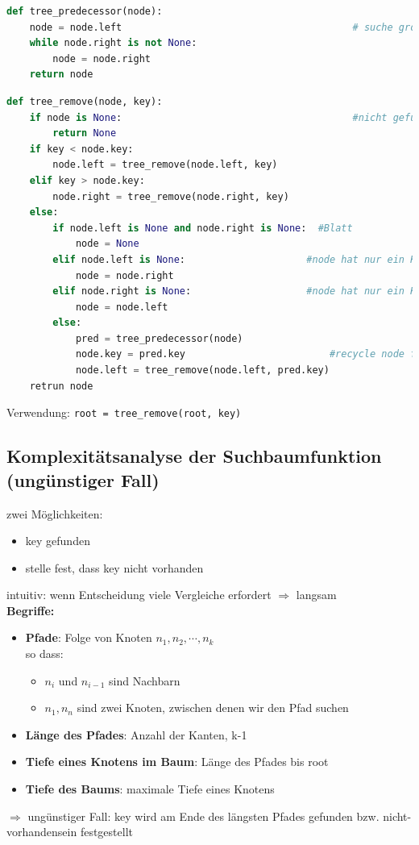 \documentclass[11pt, fleqn]{scrreprt}
\begin{document}
\begin{lstlisting}[language=Python]
def tree_predecessor(node):
	node = node.left										# suche groessten Key im linken Teilbaum
	while node.right is not None:
		node = node.right
	return node
\end{lstlisting}
	
\begin{lstlisting}[language=Python]
def tree_remove(node, key):
	if node is None: 										#nicht gefunden
		return None
	if key < node.key:
		node.left = tree_remove(node.left, key)
	elif key > node.key:
		node.right = tree_remove(node.right, key)
	else:																#key gefunden
		if node.left is None and node.right is None:  #Blatt
			node = None
		elif node.left is None:						#node hat nur ein Kind
			node = node.right
		elif node.right is None:					#node hat nur ein Kind
			node = node.left
		else:															#node hat 2 Kinder
			pred = tree_predecessor(node)
			node.key = pred.key							#recycle node fuer seinen Vorgaenger
			node.left = tree_remove(node.left, pred.key)
	retrun node
\end{lstlisting}

Verwendung: \verb|root = tree_remove(root, key)|


\subsection*{Komplexitätsanalyse der Suchbaumfunktion (ungünstiger Fall)}
zwei Möglichkeiten:
\begin{itemize}
	\item key gefunden
	\item stelle fest, dass key nicht vorhanden
\end{itemize}
intuitiv: wenn Entscheidung viele Vergleiche erfordert $\Rightarrow$ langsam \\
\textbf{Begriffe:}
\begin{itemize}
	\item \textbf{Pfade}: Folge von Knoten $n_1, n_2, \cdots, n_k$ \\
	so dass: 
	\begin{itemize}
		\item $n_i$ und $n_{i-1}$ sind Nachbarn
		\item $n_1, n_n$ sind zwei Knoten, zwischen denen wir den Pfad suchen
	\end{itemize}
	\item \textbf{Länge des Pfades}: Anzahl der Kanten, k-1
	\item \textbf{Tiefe eines Knotens im Baum}: Länge des Pfades bis root
	\item \textbf{Tiefe des Baums}: maximale Tiefe eines Knotens
\end{itemize}
$\Rightarrow$ ungünstiger Fall: key wird am Ende des längsten Pfades gefunden bzw. nicht-vorhandensein festgestellt
\end{document}
